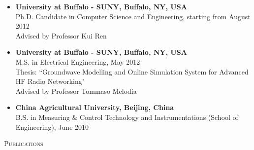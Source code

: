 \documentclass[letter]{article}
\newcommand{\heading}[1]{\item \large \textsc{#1} \normalsize}
\newcommand{\publication}[4]{\item #1. #2. \emph{#3.} #4}
\begin{document}
\begin{description}
\begin{itemize}
\item \textbf{University at Buffalo - SUNY, Buffalo, NY, USA} \\
Ph.D. Candidate in Computer Science and Engineering, starting from August 2012\\
Advised by Professor Kui Ren

\item \textbf{University at Buffalo - SUNY, Buffalo, NY, USA} \\
M.S. in Electrical Engineering, May 2012\\
Thesis: ``Groundwave Modelling and Online Simulation System for Advanced HF Radio Networking" \\
Advised by Professor Tommaso Melodia

\item \textbf{China Agricultural University, Beijing, China} \\
B.S. in Measuring \& Control Technology and Instrumentations (School of Engineering), June 2010\\
\end{itemize}

%




\heading{Publications}









\end{description}
\end{document}
